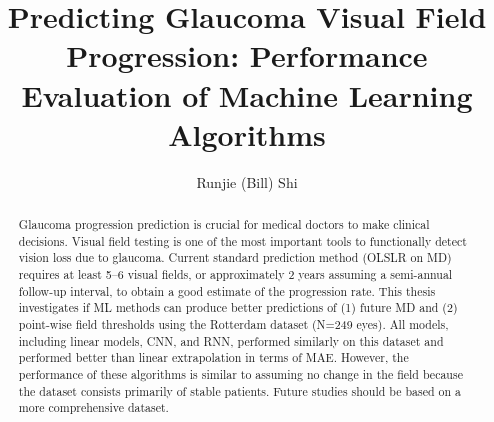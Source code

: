 \documentclass[onehalfspaced, 12pt, normalmargins]{ut-thesis}
\author{Runjie (Bill) Shi}
\title{Predicting Glaucoma Visual Field Progression: Performance Evaluation of Machine Learning Algorithms}
\begin{document}
	
\newcommand{\vf}{\textrm{VF}}
\newcommand{\md}{\textrm{MD}}
\newcommand{\iop}{\textrm{IOP}}

\begin{preliminary}

\makecover
\addtocounter{page}{-1}
\maketitle
\addtocounter{page}{-1}


\begin{abstract}
Glaucoma progression prediction is crucial for medical doctors to make clinical decisions. Visual field testing is one of the most important tools to functionally detect vision loss due to glaucoma. Current standard prediction method (\ac{OLSLR} on \ac{MD}) requires at least 5--6 visual fields, or approximately 2 years assuming a semi-annual follow-up interval, to obtain a good estimate of the progression rate. This thesis investigates if \acf{ML} methods can produce better predictions of (1) future \ac{MD} and (2) point-wise field thresholds using the Rotterdam dataset (N=249 eyes). All models, including linear models, \ac{CNN}, and \ac{RNN}, performed similarly on this dataset and performed better than linear extrapolation in terms of \ac{MAE}. However, the performance of these algorithms is similar to assuming no change in the field because the dataset consists primarily of stable patients. Future studies should be based on a more comprehensive dataset. 

\end{abstract}



\end{preliminary}
\end{document}
